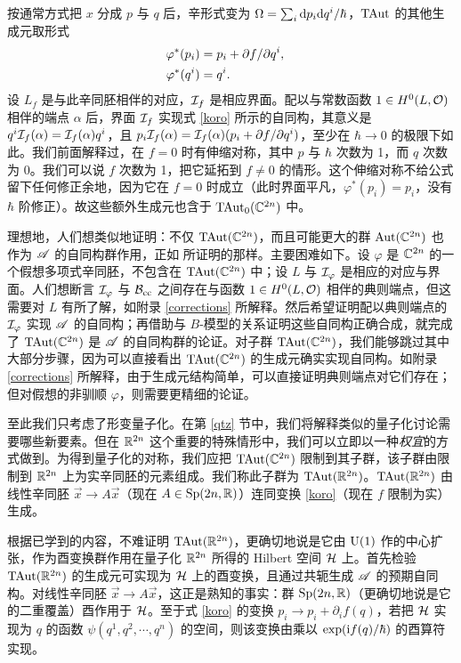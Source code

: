 按通常方式把 $x$ 分成 $p$ 与 $q$ 后，辛形式变为 $\Omega=\sum_i{\mathrm d} p_i{\mathrm d} q^i/\hbar$，${\mathrm{TAut}}$ 的其他生成元取形式
\begin{align}\label{koro}\varphi^*(p_i)&=p_i+\partial f/\partial q^i,\cr
\varphi^*(q^i)&=q^i.\end{align}
设 $L_f$ 是与此辛同胚相伴的对应，${\mathcal I}_f$ 是相应界面。配以与常数函数 $1\in H^0(L,{\mathcal O})$ 相伴的端点 $\alpha$ 后，界面 ${\mathcal I}_f$ 实现式 \eqref{koro} 所示的自同构，其意义是
$q^i{\mathcal I}_f(\alpha)={\mathcal I}_f(\alpha)q^i$，且 $p_i{\mathcal I}_f(\alpha)={\mathcal I}_f(\alpha)(p_i+\partial f/\partial q^i)$，至少在 $\hbar\to0$ 的极限下如此。我们前面解释过，在 $f=0$ 时有伸缩对称，其中 $p$ 与 $\hbar$ 次数为 1，而 $q$ 次数为 0。我们可以说 $f$ 次数为 1，把它延拓到 $f\ne0$ 的情形。这个伸缩对称不给公式留下任何修正余地，因为它在 $f=0$ 时成立（此时界面平凡，$\varphi^*(p_i)=p_i$，没有 $\hbar$ 阶修正）。故这些额外生成元也含于 ${\mathrm{TAut}}_0({\mathbb C}^{2n})$ 中。

理想地，人们想类似地证明：不仅 ${\mathrm{TAut}}({\mathbb C}^{2n})$，而且可能更大的群 ${\mathrm{Aut}}({\mathbb C}^{2n})$ 也作为 ${\mathscr A}$ 的自同构群作用，正如 \cite{BEY} 所证明的那样。主要困难如下。设 $\varphi$ 是 ${\mathbb C}^{2n}$ 的一个假想多项式辛同胚，不包含在 ${\mathrm{TAut}}({\mathbb C}^{2n})$ 中；设 $L$ 与 ${\mathcal I}_\varphi$ 是相应的对应与界面。人们想断言 ${\mathcal I}_\varphi$ 与 ${\mathcal B}_{\mathrm{cc}}$ 之间存在与函数 $1\in H^0(L,{\mathcal O})$ 相伴的典则端点，但这需要对 $L$ 有所了解，如附录 \ref{corrections} 所解释。然后希望证明配以典则端点的 ${\mathcal I}_\varphi$ 实现 ${\mathscr A}$ 的自同构；再借助与 $B$-模型的关系证明这些自同构正确合成，就完成了 ${\mathrm{TAut}}({\mathbb C}^{2n})$ 是 ${\mathscr A}$ 的自同构群的论证。对子群 ${\mathrm{TAut}}({\mathbb C}^{2n})$，我们能够跳过其中大部分步骤，因为可以直接看出 ${\mathrm{TAut}}({\mathbb C}^{2n})$ 的生成元确实实现自同构。如附录 \ref{corrections} 所解释，由于生成元结构简单，可以直接证明典则端点对它们存在；但对假想的非驯顺 $\varphi$，则需要更精细的论证。

至此我们只考虑了形变量子化。在第 \ref{qtz} 节中，我们将解释类似的量子化讨论需要哪些新要素。但在 ${\mathbb R}^{2n}$ 这个重要的特殊情形中，我们可以立即以一种\emph{权宜}的方式做到。为得到量子化的对称，我们应把 ${\mathrm{TAut}}({\mathbb C}^{2n})$ 限制到其子群，该子群由限制到 ${\mathbb R}^{2n}$ 上为实辛同胚的元素组成。我们称此子群为 ${\mathrm{TAut}}({\mathbb R}^{2n})$。${\mathrm{TAut}}({\mathbb R}^{2n})$ 由线性辛同胚 $\vec x\to A\vec x$（现在 $A\in{\mathrm{Sp}}(2n,{\mathbb R})$）连同变换 \eqref{koro}（现在 $f$ 限制为实）生成。

根据已学到的内容，不难证明 ${\mathrm{TAut}}({\mathbb R}^{2n})$，更确切地说是它由 ${\mathrm U}(1)$ 作的中心扩张，作为酉变换群作用在量子化 ${\mathbb R}^{2n}$ 所得的 Hilbert 空间 ${\mathcal H}$ 上。首先检验 ${\mathrm{TAut}}({\mathbb R}^{2n})$ 的生成元可实现为 ${\mathcal H}$ 上的酉变换，且通过共轭生成 ${\mathscr A}$ 的预期自同构。对线性辛同胚 $\vec x\to A\vec x$，这正是熟知的事实：群 ${\mathrm{Sp}}(2n,{\mathbb R})$（更确切地说是它的二重覆盖）酉作用于 ${\mathcal H}$。至于式 \eqref{koro} 的变换 $p_i\to p_i+\partial_i f(q)$，若把 ${\mathcal H}$ 实现为 $q$ 的函数 $\psi(q^1,q^2,\cdots,q^n)$ 的空间，则该变换由乘以 $\exp({\mathrm i} f(q)/\hbar)$ 的酉算符实现。

